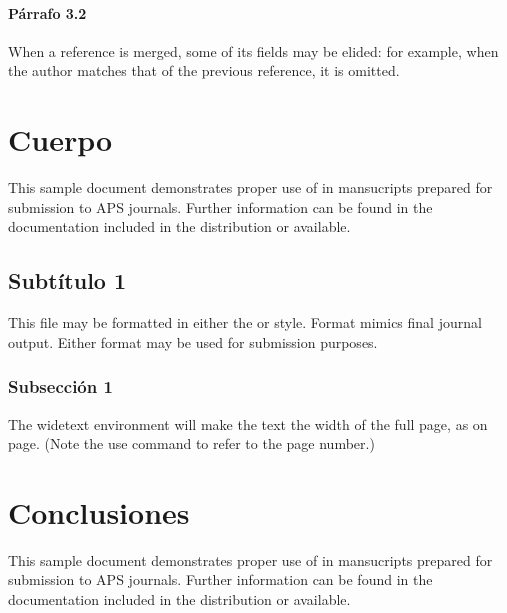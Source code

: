 \documentclass[%
 reprint,
 amsmath,amssymb,
 aps,
]{revtex4-2}
\begin{document}
\paragraph{Párrafo 3.2}
When a reference is merged, some \cite{Berman1983} of its fields may be elided: for example, when the author matches that of the previous reference, it is omitted. 

\section{\label{sec:level1}Cuerpo}

This sample document demonstrates proper use of in mansucripts prepared for submission to APS journals. Further information can be found in the documentation included in the distribution or available.

\subsection{Subtítulo 1}

This file may be formatted in either the or style. Format mimics final journal output. Either format may be used for submission purposes.

\subsubsection{Subsección 1}
The widetext environment will make the text the width of the
full page, as on page. (Note the use command to refer to the page number.) 

\section{\label{sec:level1}Conclusiones}

This sample document demonstrates proper \cite{ZS71} use of in mansucripts prepared for submission to APS journals. Further information can be found in the documentation included in the distribution or available.

\end{document}
